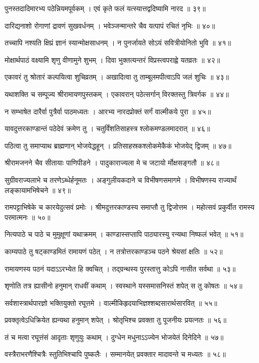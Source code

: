 पुनस्तदादिमारभ्य पठेन्नियमपूर्वकम् ।
एवं कृते फलं यत्स्यात्तद्वदिष्यामि नारद ॥ ३९॥

दारिद्यनाशो रोगाणां द्रावणं सुखवर्धनम् ।
भवेञ्जन्मान्तरे चैव यत्पापं रचितं नृभिः ॥ ४०॥

तच्चापि नश्यति क्षिप्रं ज्ञानं स्यान्मोक्षसाधनम् ।
न पुनर्जायते सोऽयं सवित्रीयोनितो भुवि ॥ ४१॥

मोक्षार्थपाठं वक्ष्यामि श‍ृणु वीणामुने शुभम् ।
दिवा भुक्तत्यन्तरं विप्रस्त्वपराह्वे यतव्रतः ॥ ४२॥

एकावरं तु श्रोतारं कल्पयित्वा शुचिव्रतम् ।
अखादित्वा तु ताम्बूलमपीत्वाऽपि जलं शुचिः ॥ ४३॥

यथाशक्ति च सम्पूज्य श्रीरामायणपुस्तकम् ।
एकावरान् पठेत्सर्गान् विरक्तस्तु त्रिवर्गक ॥ ४४॥

न सम्भाषेत दारैर्वा पुत्रैर्वा पाठमध्यतः ।
आरभ्य नारदप्रोक्तं सर्गं वाल्मीकये पुरा ॥ ४५॥

यावदुत्तरकाण्डान्तं पठेदेवं क्रमेण तु ।
चतुर्विंशतिसाहस्त्र श्लोकमण्डलमादरात् ॥ ४६॥

पठित्वा तु समाप्याथ ब्राह्मणान् भोजयेद्धहून् ।
प्रतिसाहस्रकश्लोकमेकैकं भोजयेद् द्विजम् ॥ ४७॥

श्रीरामजनने चैव सीतायाः पाणिपीडने ।
पादुकाराज्यला मे च जटायो र्मोक्षसङ्गतौ ॥ ४८॥

सुग्रीवराज्यलाभे च तरणेऽब्धेर्हनूमतः ।
अङ्गुलीयकदाने च विभीषणसमागमे ।
विभीषणस्य राज्यार्थं लङ्कायामभिषेचने ॥ ४९॥

रामपट्टाभिषेके च कारयेदुत्सवं प्रमोः ।
श्रीमदुत्तरकाण्डस्य समाप्तौ तु द्विजोत्तम ।
महोत्सवं प्रकुर्वीत रामस्य परमात्मनः ॥ ५०॥

नित्यपाठे च पाठे च मुमुक्षूणां यथाक्रमम् ।
काण्डास्सप्तापि पाठ्यारस्यु रन्यथा निष्फलं भवेत् ॥ ५१॥

काम्यपाठे तु षट्काण्डमितं रामायणं पठेत् ।
न तत्रोत्तरकाण्डञ्च पठने श्रेयसां क्षतिः ॥ ५२॥

रामायणस्य पठनं यदाऽऽरभ्येत हि क्वचित् ।
तद्ग्रन्थस्य पुरस्तात्तु कोऽपि नासीत सर्वथा ॥ ५३॥

श‍ृणोति तत्र ह्यासीनो हनुमान् राधवीं कथाम् ।
स्वस्थाने यस्समासनिस्तं शपेत् स तु कोषतः ॥ ५४॥

सर्वशास्त्रार्थपारज्ञो भक्तियुक्तो रघूत्तमे ।
वाल्मीकिहृदयाभिज्ञश्शब्दसारार्थसारवित् ॥ ५५॥

प्रवक्तृत्वेऽधिक्रियेत ह्यन्यथा हनुमान् शपेत् ।
श्रोतृभिश्च प्रवक्ता तु पूजनीयः प्रयत्नतः ॥ ५६॥

तं च मत्वा रघूत्तंसं आदृताः श‍ृणुयुः कथाम् ।
दुग्धेन मधुनाऽऽज्येन भोजयेतं दिनेदिने ॥ ५७॥

वस्त्रैराभरणैश्चित्रैः स्तुतिभिश्चापि पुष्कलैः ।
सम्मानयेत् प्रवक्तार मादावन्ते च मध्यतः ॥ ५८॥

